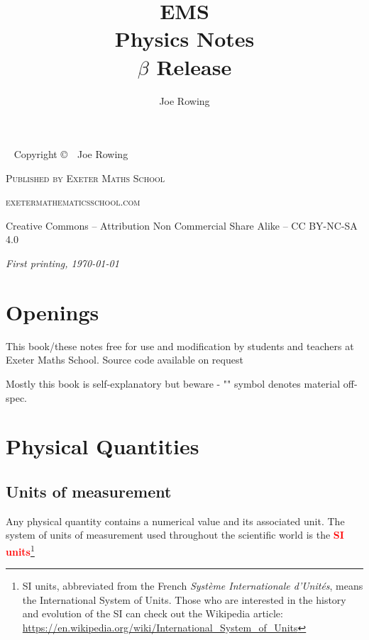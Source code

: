 \documentclass[a4paper,12pt]{book}
\title{EMS \\Physics Notes \\ $\beta$ Release}
\author[Joe Rowing]{Joe Rowing}
\newcommand{\piste}{{\fontencoding{U}\fontfamily{futs}\selectfont\char 49\relax}}
\newcommand{\keypoint}[1]{\textbf{\textcolor{red}{#1}}}
\newenvironment{fullwidth}{}{}
\newcommand{\piste}{\textsuperscript{$\star$}}
\newcommand{\keypoint}[1]{\textbf{\textcolor{red}{#1}}}
\begin{document}
\frontmatter

\maketitle

\newpage
\begin{fullwidth}
~\vfill
\thispagestyle{empty}
\setlength{\parindent}{0pt}
\setlength{\parskip}{\baselineskip}
Copyright \copyright\ \the\year\ Joe Rowing

\par\textsc{Published by Exeter Maths School}

\par\textsc{exetermathematicsschool.com}

\par Creative Commons -- Attribution Non Commercial Share Alike -- CC BY-NC-SA 4.0

\par\textit{First printing, \today}
\end{fullwidth}

\tableofcontents

\mainmatter

\chapter{Openings}

This book/these notes free for use and modification by students and teachers at Exeter Maths School. Source code available on request

Mostly this book is self-explanatory but beware - "\piste" symbol denotes material off-spec.

\cleardoublepage

\chapter{Physical Quantities}

\section{Units of measurement}

Any physical quantity contains a numerical value and its associated unit. The system of units of measurement used throughout the scientific world is the \keypoint{SI units}\footnote{SI units, abbreviated from the French \emph{Syst\`eme Internationale d'Unit\'es}, means the International System of Units. Those who are interested in the history and evolution of the SI can check out the Wikipedia article: \url{https://en.wikipedia.org/wiki/International_System_of_Units}}
\end{document}
